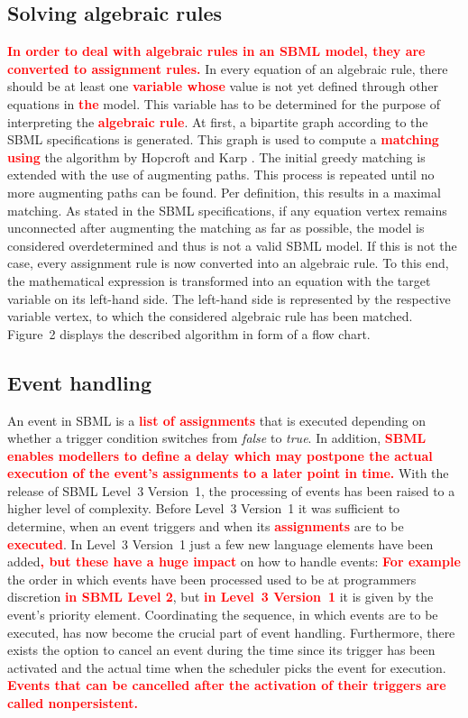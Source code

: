 \documentclass[10pt]{bmc_article}
\newenvironment{bmcformat}{\baselineskip20pt\sloppy\setboolean{publ}{false}}{\baselineskip20pt\sloppy}
\newcommand{\TODO}[1]{\textcolor{red}{\textbf{#1}}}
\newcommand{\true}{\emph{true}}
\newcommand{\false}{\emph{false}}
\begin{document}
\begin{bmcformat}
\subsection*{Solving algebraic rules}
\TODO{In order to deal with algebraic rules in an SBML model, \TODO{they} are converted to assignment rules.}
In every equation of an algebraic rule, there should be at least one \TODO{variable 
whose} value is not yet defined through other equations in \TODO{the} model. This variable has to be determined 
for the purpose of interpreting the \TODO{algebraic rule}. 
At first, a bipartite graph according to the SBML specifications is generated. This graph is used to 
compute a \TODO{matching using} the algorithm by Hopcroft and Karp
\cite{hopcroft1973n}. The initial greedy matching is extended with the use of augmenting paths. This process is
repeated until no more augmenting paths can be found. Per definition, this results in a maximal matching. 
As stated in the SBML specifications, if any equation vertex remains unconnected after augmenting the 
matching as far as possible, the model is considered overdetermined and thus is not a valid SBML model. 
If this is not the case, every assignment rule is now converted into an algebraic rule. 
To this end, the mathematical expression is transformed into an equation with the target variable on its left-hand side.
The left-hand side is represented by the respective variable vertex, to which the considered algebraic rule has been matched.
Figure~2 displays the described algorithm in form of a flow chart.


\subsection*{Event handling}
An event in SBML is a \TODO{list of assignments} that is executed depending on whether a trigger 
condition switches from \false{} to \true.
In addition, \TODO{SBML enables modellers to define a delay which may postpone the actual execution of the event's assignments
to a later point in time.}
With the release of SBML Level~3 Version~1, the processing of events has been
raised to a higher level of complexity.
Before Level~3 Version~1 it was sufficient to determine, when an event triggers and when its \TODO{assignments} are to be \TODO{executed}.
In Level~3 Version~1 just a few new language elements have been added\TODO{, but these have a huge impact} on how to handle events:
\TODO{For example} the order in which events have been processed used to be at programmers discretion \TODO{in SBML Level 2}, but \TODO{in Level~3 Version~1} it is given by the event's priority element.
Coordinating the sequence, in which events are to be executed, has now become the crucial part of event handling. 
Furthermore, there exists the option to cancel an event during the time since its trigger 
has been activated and the actual time when the scheduler picks the event for execution. \TODO{Events that can be cancelled after the activation of their triggers are called nonpersistent.}


\end{bmcformat}
\end{document}
